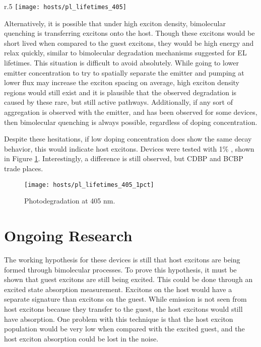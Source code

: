 \documentclass[../thesis.tex]{subfiles}
\begin{document}
\begin{wrapfigure}{r}{.5\textwidth}
\centering
\texttt{[image: hosts/pl\_lifetimes\_405]}
\caption{Photodegradation at 405 nm. }
\label{fig:hosts_pl405}
\end{wrapfigure}

Alternatively, it is possible that under high exciton density, bimolecular quenching is transferring excitons onto the host.
Though these excitons would be short lived when compared to the guest excitons, they would be high energy and relax quickly, similar to bimolecular degradation mechanisms suggested for EL lifetimes.\supercite{Giebink2008a,Bangsund2018}
This situation is difficult to avoid absolutely.
While going to lower emitter concentration to try to spatially separate the emitter and pumping at lower flux may increase the exciton spacing on average, high exciton density regions would still exist and it is plausible that the observed degradation is caused by these rare, but still active pathways.
Additionally, if any sort of aggregation is observed with the emitter, and has been observed for some devices, then bimolecular quenching is always possible, regardless of doping concentration.\supercite{Reineke2009}

Despite these hesitations, if low doping concentration does show the same decay behavior, this would indicate host excitons.
Devices were tested with 1\% \irppy, shown in Figure \ref{fig:hosts_pl405_1pct}.
Interestingly, a difference is still observed, but CDBP and BCBP trade places.

\begin{figure}[ht]
\centering
\texttt{[image: hosts/pl\_lifetimes\_405\_1pct]}
\caption{Photodegradation at 405 nm. }
\label{fig:hosts_pl405_1pct}
\end{figure}

\section{Ongoing Research}


The working hypothesis for these devices is still that host excitons are being formed through bimolecular processes.
To prove this hypothesis, it must be shown that guest excitons are still being excited.
This could be done through an excited state absorption measurement.\supercite{Laming1988,Ichimura1987}
Excitons on the host would have a separate signature than excitons on the guest.
While emission is not seen from host excitons because they transfer to the guest, the host excitons would still have absorption.
One problem with this technique is that the host exciton population would be very low when compared with the excited guest, and the host exciton absorption could be lost in the noise.
\end{document}
